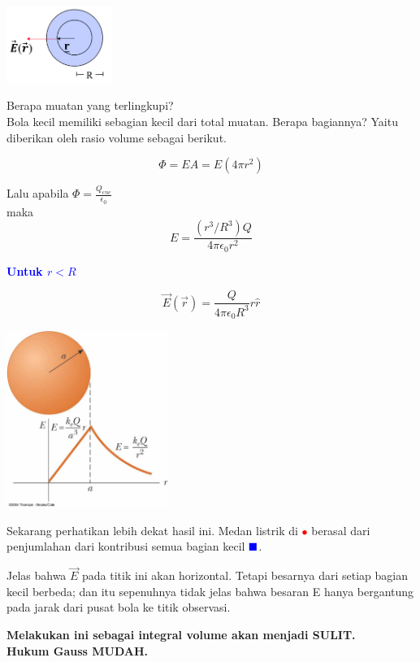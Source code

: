 \documentclass[twocolumn, 11pt]{article}%
\begin{document}
    \begin{center}
        \includegraphics[width=130px]{28.png}
    \end{center}

    Berapa muatan yang terlingkupi?\\
    Bola kecil memiliki sebagian kecil dari total muatan. Berapa bagiannya? Yaitu diberikan oleh rasio volume sebagai berikut.

    \[ \Phi = EA = E(4\pi r^2) \]

    Lalu apabila $\displaystyle \Phi = \frac{Q_{enc}}{\epsilon_0}$\\
    maka
    \[ E = \frac{(r^3/R^3)Q}{4\pi\epsilon_0 r^2} \]

    \textcolor{blue}{ \textbf{Untuk $r<R$}  }

    \[ \vec E (\vec r) = \frac{Q}{4\pi \epsilon_0 R^3}r \hat r \]

    \begin{center}
        \includegraphics[width=200px]{29.png}
    \end{center}

    Sekarang perhatikan lebih dekat hasil ini. Medan listrik di \textcolor{red}{$\bullet$} berasal dari penjumlahan dari kontribusi semua bagian kecil $\color{blue}\blacksquare$.

    Jelas bahwa $\vec E$ pada titik ini akan horizontal. Tetapi besarnya dari setiap bagian kecil berbeda; dan itu sepenuhnya tidak jelas bahwa besaran E hanya bergantung pada jarak dari pusat bola ke titik observasi.

    \textbf{Melakukan ini sebagai integral volume akan menjadi SULIT.}\\
    \textbf{Hukum Gauss MUDAH.}
    
\end{document}
